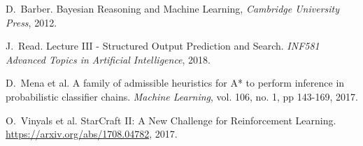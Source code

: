 \documentclass[journal, a4paper]{IEEEtran}
\theoremstyle{plain}
\theoremstyle{definition}
\begin{document}
\begin{thebibliography}{4}

	D.~Barber. Bayesian Reasoning and Machine Learning,
	{\em Cambridge University Press}, 2012.

		J.~Read. Lecture III - Structured Output Prediction and Search. \textit{INF581 Advanced Topics in Artificial Intelligence}, 2018.

	D.~Mena et al. A family of admissible heuristics for A* to perform inference in probabilistic classifier chains.
	{\em Machine Learning}, vol. 106, no. 1, pp 143-169, 2017.

	O.~Vinyals et al. StarCraft {II:} {A} New Challenge for Reinforcement Learning.
	\url{https://arxiv.org/abs/1708.04782}, 2017. 

\end{thebibliography}

\end{document}
